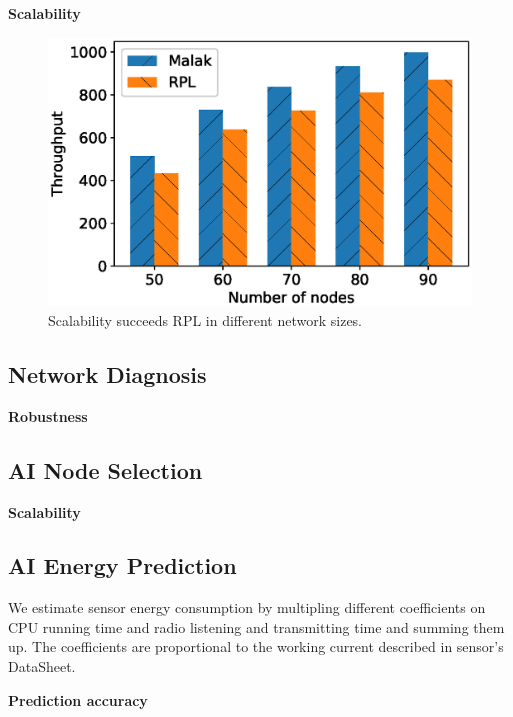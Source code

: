 \textbf{Scalability}

\begin{figure}[htbp]
	\centering
	\includegraphics[width=.85\columnwidth]{Figure/scalability}
	\vspace{-0.1in}
	\caption{Scalability
		\textnormal{
			{\sdn} succeeds RPL in different network sizes.
		}}
	\label{fig:scalability}
\end{figure}

\subsection{Network Diagnosis}
\textbf{Robustness}

\subsection{AI Node Selection}
\textbf{Scalability}

\subsection{AI Energy Prediction}

We estimate sensor energy consumption by multipling different coefficients on
CPU running time and radio listening and transmitting time and summing them up.
The coefficients are proportional to the working current described in sensor's
DataSheet.

\textbf{Prediction accuracy}

